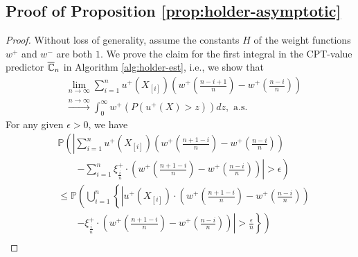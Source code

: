 \subsection*{Proof of Proposition \ref{prop:holder-asymptotic}}

\begin{proof}
Without loss of generality, assume the  \holder constants $H$ of the weight functions $w^+$ and $w^-$ are both  $1$.
We prove the claim for the first integral in the CPT-value predictor $\overline {\mathbb{C}}_n$ in Algorithm \ref{alg:holder-est}, i.e., we show  that 
\begin{align}
&\lim_{n\rightarrow \infty} \sum_{i=1}^{n} u^+\left(X_{[i]}\right) \left(w^+\left(\frac{n-i+1}{n}\right)- w^+\left(\frac{n-i}{n}\right)\right)\nonumber\\
&\xrightarrow{n \rightarrow\infty} \int_0^{\infty} w^+\left(P\left(u^+(X)>z\right)\right) dz , \text{ a.s.} 
\label{eq:claim11}
\end{align}
%
%
For any given $\epsilon>0$, we have 
\begin{align*}
& \mathbb{P} \left( \left| \sum_{i=1}^{n} u^+\left(X_{[i]}\right)  \left(w^+\left(\frac{n+1-i}{n} \right)  - w^+\left(\frac{n-i}{n} \right) \right) \right.\right. \\
&\qquad\left.\left.-\sum_{i=1}^{n} \xi^+_{\frac{i}{n}} \cdot \left(w^+\left(\frac{n+1-i}{n} \right)  - w^+\left(\frac{n-i}{n} \right) \right) \right| >
\epsilon\right) \\ 
& \leq \mathbb{P}\left( \bigcup _{i=1}^{n} \left\{ \left| u^+\left(X_{[i]}\right) \cdot \left(w^+\left(\frac{n+1-i}{n}\right) -
w^+\left(\frac{n-i}{n}\right)\right)\right.\right.\right. \\
&\qquad\left.\left.\left.- \xi^+_{\frac{i}{n}} \cdot \left(w^+\left(\frac{n+1-i}{n} \right)  - w^+\left(\frac{n-i}{n} \right) \right)
\right| > \frac{\epsilon}{n} \right\}\right) \\ 

\end{align*}
\end{proof}
